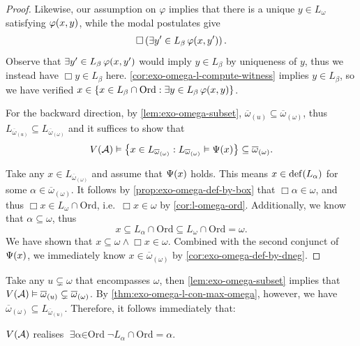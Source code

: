 \documentclass[12pt,openany]{book}
\theoremstyle{plain}
\theoremstyle{definition}
\newcommand\opE[1]{\mathop{\exists #1}}
\DeclareMathOperator\dd{def}
\newcommand\Ord{\mathrm{Ord}}
\begin{document}
\begin{proof}
  Likewise, our assumption on $\varphi$ implies that there is a unique $y \in L_\omega$ satisfying $\varphi\mleft(x, y\mright)$, while the modal postulates give
  \[\Box \left(\opE{y' \in L_\beta} \varphi\mleft(x, y'\mright)\right).\]
  Observe that $\opE{y' \in L_\beta} \varphi\mleft(x, y'\mright)$ would imply $y \in L_\beta$ by uniqueness of $y$, thus we instead have $\Box y \in L_\beta$ here. \autoref{cor:exo-omega-l-compute-witness} implies $y \in L_\beta$, so we have verified $x \in \left\{x \in L_\beta \cap \Ord : \opE{y \in L_\beta} \varphi\mleft(x, y\mright)\right\}$.

  For the backward direction, by \autoref{lem:exo-omega-subset}, $\overline{\omega}_{(u)} \subseteq \overline{\omega}_{(\omega)}$, thus $L_{\overline{\omega}_{(u)}} \subseteq L_{\overline{\omega}_{(\omega)}}$ and it suffices to show that
  \[V\mleft(\mathcal{A}\mright) \vDash \left\{x \in L_{\overline{\omega}_{(\omega)}} : L_{\overline{\omega}_{(\omega)}} \vDash \Psi\mleft(x\mright)\right\} \subseteq \overline{\omega}_{(\omega)}.\]

  Take any $x \in L_{\overline{\omega}_{(\omega)}}$ and assume that $\Psi\mleft(x\mright)$ holds. This means $x \in \dd\mleft(L_\alpha\mright)$ for some $\alpha \in \overline{\omega}_{(\omega)}$. It follows by \autoref{prop:exo-omega-def-by-box} that $\Box \alpha \in \omega$, and thus $\Box x \in L_\omega \cap \Ord$, i.e.\ $\Box x \in \omega$ by \autoref{cor:l-omega-ord}. Additionally, we know that $\alpha \subseteq \omega$, thus
  \[x \subseteq L_\alpha \cap \Ord \subseteq L_\omega \cap \Ord = \omega.\]
  We have shown that $x \subseteq \omega \land \Box x \in \omega$. Combined with the second conjunct of $\Psi\mleft(x\mright)$, we immediately know $x \in \overline{\omega}_{(\omega)}$ by \autoref{cor:exo-omega-def-by-dneg}.
\end{proof}

Take any $u \subsetneq \omega$ that encompasses $\omega$, then \autoref{lem:exo-omega-subset} implies that $V\mleft(\mathcal{A}\mright) \vDash \overline{\omega}_{(u)} \subsetneq \overline{\omega}_{(\omega)}$. By \autoref{thm:exo-omega-l-con-max-omega}, however, we have $\overline{\omega}_{(\omega)} \subseteq L_{\overline{\omega}_{(u)}}$. Therefore, it follows immediately that:
\begin{corollary}
  \label{cor:czf-real-alpha-l-alpha-mismatch}
  $V\mleft(\mathcal{A}\mright)$ realises $\opE{\alpha \in \Ord} \neg L_\alpha \cap \Ord = \alpha$.
\end{corollary}
\end{document}
